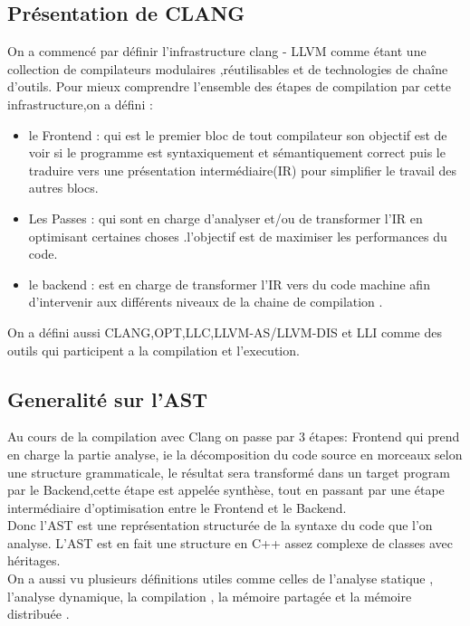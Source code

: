 \documentclass[12pt,titlepage]{article}
\begin{document}
\subsection{Présentation de CLANG \cite{clangllvm}  }

On a commencé par définir l'infrastructure clang - LLVM  comme étant une collection de compilateurs modulaires ,réutilisables et de technologies de chaîne d’outils. Pour mieux comprendre l’ensemble des étapes de compilation par cette infrastructure,on a défini :
    \begin{itemize}

    \item le Frontend : qui est le premier bloc de tout compilateur son objectif est de voir si le programme est syntaxiquement et sémantiquement correct puis le traduire vers une présentation intermédiaire(IR) pour simplifier le travail des autres blocs.
    \item Les Passes : qui sont en charge d'analyser et/ou de transformer l'IR en optimisant certaines choses .l'objectif est de maximiser les performances du code.
    \item le backend : est en charge de transformer l'IR vers du code machine afin d'intervenir aux différents niveaux de la chaine de compilation .
     \end{itemize}
 On a défini aussi CLANG,OPT,LLC,LLVM-AS/LLVM-DIS et LLI comme des outils qui participent a la compilation et l'execution.



\subsection{Generalité sur l'AST}

Au cours de la compilation avec Clang on passe par 3 étapes: Frontend qui prend en charge la partie analyse, ie la décomposition du code source en morceaux selon une structure grammaticale, le résultat sera transformé  dans un target program par le Backend,cette étape est appelée synthèse, tout en passant par une étape intermédiaire d'optimisation entre le Frontend et le Backend.\cite{Devlieghere}\\ Donc l’AST est une représentation structurée de la syntaxe du code que l’on analyse. L’AST est en fait une structure en C++ assez complexe de classes avec héritages.\\


 On a aussi vu plusieurs définitions utiles comme celles de l'analyse statique , l'analyse dynamique, la compilation , la mémoire partagée et la mémoire distribuée .
\end{document}
